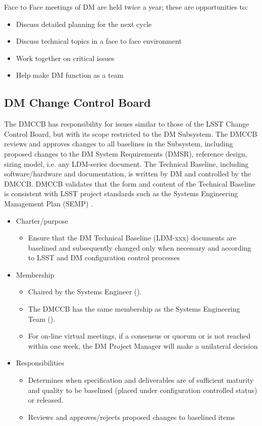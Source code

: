 Face to Face meetings of DM are held twice a year; these are opportunities to:

\begin{itemize}
\item Discuss detailed planning for the next cycle
\item Discuss technical topics in a face to face environment
\item Work together on critical issues
\item Help make DM function as a team
\end{itemize}

\subsection{DM Change Control Board \label{sect:dmccb}}

The DMCCB has responsibility for issues similar to those of the LSST Change Control Board, but with its scope restricted to the DM Subsystem.
The DMCCB reviews and approves changes to all baselines in the Subsystem, including proposed changes to the DM System Requirements (DMSR), reference design, sizing model, i.e. any LDM-series document.
The Technical Baseline, including software/hardware and documentation, is written by DM and controlled by the DMCCB.
DMCCB validates that the form and content of the Technical Baseline is consistent with LSST project standards such as the Systems Engineering Management Plan (SEMP) .

\begin{itemize}
\item Charter/purpose
	\begin{itemize}
	\item Ensure that the DM Technical Baseline (LDM-xxx) documents are baselined and subsequently changed only when necessary and according to LSST and DM configuration control processes
	\end{itemize}
\item Membership
	\begin{itemize}
	\item Chaired by the Systems Engineer ().
	\item The DMCCB has the same membership as the Systems Engineering Team ().
	\item For on-line virtual meetings, if a consensus or quorum or is not reached within one week, the DM Project Manager will make a unilateral decision
	\end{itemize}
\item Responsibilities
	\begin{itemize}
	\item Determines when specification and deliverables are of sufficient maturity and quality to be baselined (placed under configuration controlled status) or released.
	\item Reviews and approves/rejects proposed changes to baselined items
	\end{itemize}
\end{itemize}

